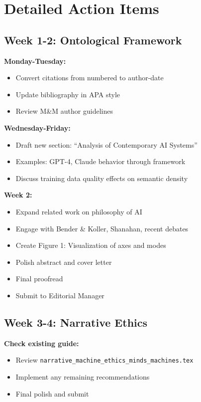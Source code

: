 \documentclass[12pt]{article}
\begin{document}
\section{Detailed Action Items}

\subsection{Week 1-2: Ontological Framework}

\textbf{Monday-Tuesday:}
\begin{itemize}[leftmargin=*]
\item Convert citations from numbered to author-date
\item Update bibliography in APA style
\item Review M\&M author guidelines
\end{itemize}

\textbf{Wednesday-Friday:}
\begin{itemize}[leftmargin=*]
\item Draft new section: ``Analysis of Contemporary AI Systems''
\item Examples: GPT-4, Claude behavior through framework
\item Discuss training data quality effects on semantic density
\end{itemize}

\textbf{Week 2:}
\begin{itemize}[leftmargin=*]
\item Expand related work on philosophy of AI
\item Engage with Bender \& Koller, Shanahan, recent debates
\item Create Figure 1: Visualization of axes and modes
\item Polish abstract and cover letter
\item Final proofread
\item Submit to Editorial Manager
\end{itemize}

\subsection{Week 3-4: Narrative Ethics}

\textbf{Check existing guide:}
\begin{itemize}[leftmargin=*]
\item Review \texttt{narrative\_machine\_ethics\_minds\_machines.tex}
\item Implement any remaining recommendations
\item Final polish and submit
\end{itemize}
\end{document}
